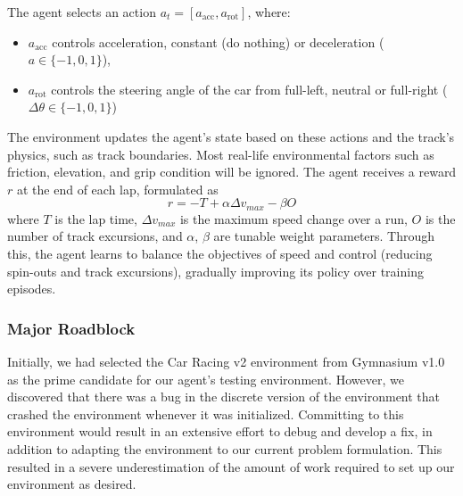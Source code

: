 \documentclass{article}
\begin{document}
The agent selects an action \(a_t = [a_{\text{acc}}, a_{\text{rot}}]\), where:
\begin{itemize}
	\item \(a_{\text{acc}}\) controls acceleration, constant (do nothing) or deceleration (\(a\in\{-1,
	      0, 1\}\)),
	\item \(a_{\text{rot}}\) controls the steering angle of the car from full-left, neutral or full-right
	      (\(\Delta\theta\in\{-1, 0, 1\}\))
\end{itemize}

The environment updates the agent’s state based on these actions and the track's physics, such as track boundaries.
Most real-life environmental factors such as friction, elevation, and grip condition will be ignored.
The agent receives a reward \(r\) at the end of each lap, formulated as 
\[ 
r = -T +\alpha\Delta v_{max} - \beta O 
\] 
where $T$ is the lap time, $\Delta v_{max}$ is the maximum speed change over a run, $O$ is the number of track excursions, and $\alpha$, $\beta$ are tunable weight parameters.
Through this, the agent learns to balance the objectives of speed and control (reducing spin-outs and track excursions), gradually improving its policy over training episodes.

\subsubsection{Major Roadblock}

Initially, we had selected the Car Racing v2 environment from Gymnasium v1.0 as the prime candidate for our agent's testing environment. However, we discovered that there was a bug in the discrete version of the environment that crashed the environment whenever it was initialized. 
Committing to this environment would result in an extensive effort to debug and develop a fix, in addition to adapting the environment to our current problem formulation. This resulted in a severe underestimation of the amount of work required to set up our environment as desired. 
\end{document}
